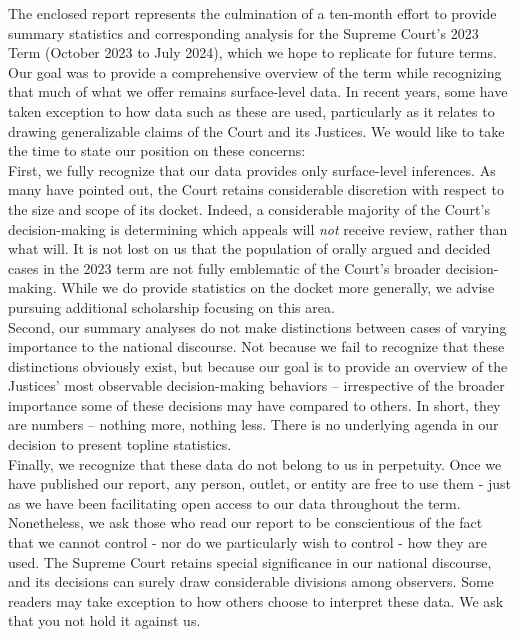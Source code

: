 
\large
\noindent The enclosed report represents the culmination of a ten-month effort to provide summary statistics and corresponding analysis for the Supreme Court's 2023 Term (October 2023 to July 2024), which we hope to replicate for future terms. \\

\noindent Our goal was to provide a comprehensive overview of the term while recognizing that much of what we offer remains surface-level data. In recent years, some have taken exception to how data such as these are used, particularly as it relates to drawing generalizable claims of the Court and its Justices. We would like to take the time to state our position on these concerns: \\

\noindent First, we fully recognize that our data provides only surface-level inferences. As many have pointed out, the Court retains considerable discretion with respect to the size and scope of its docket. Indeed, a considerable majority of the Court's decision-making is determining which appeals will \emph{not} receive review, rather than what will. It is not lost on us that the population of orally argued and decided cases in the 2023 term are not fully emblematic of the Court's broader decision-making. While we do provide statistics on the docket more generally, we advise pursuing additional scholarship focusing on this area.\\

\noindent Second, our summary analyses do not make distinctions between cases of varying importance to the national discourse. Not because we fail to recognize that these distinctions obviously exist, but because our goal is to provide an overview of the Justices' most observable decision-making behaviors -- irrespective of the broader importance some of these decisions may have compared to others. In short, they are numbers -- nothing more, nothing less. There is no underlying agenda in our decision to present topline statistics. \\

\noindent Finally, we recognize that these data do not belong to us in perpetuity. Once we have published our report, any person, outlet, or entity are free to use them - just as we have been facilitating open access to our data throughout the term. Nonetheless, we ask those who read our report to be conscientious of the fact that we cannot control - nor do we particularly wish to control - how they are used. The Supreme Court retains special significance in our national discourse, and its decisions can surely draw considerable divisions among observers. Some readers may take exception to how others choose to interpret these data. We ask that you not hold it against us. \\

